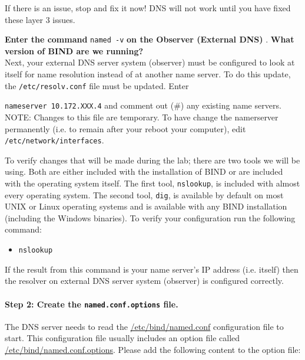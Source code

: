 \documentclass{article}
\begin{document}
If there is an issue, stop and fix it now! DNS will not work until you have fixed these layer 3 issues.  

\textbf{ \question Enter the command} {\tt named -v} \textbf{on the Observer (External DNS)} . \textbf{What version of BIND are we running?}\\

Next, your external DNS server \ubuntu system (observer) must be
configured to look at itself for name resolution instead of at another name server. To do this update, the {\tt /etc/resolv.conf} file must be updated. Enter 

{\tt nameserver 10.172.XXX.4} and comment out (\#) any existing name servers. 
NOTE: Changes to this file are temporary.  To have change the namerserver permanently (i.e. to remain after your reboot your computer), edit {\tt /etc/network/interfaces}.

To verify changes that will be made during the lab; there are two tools we will be using. Both are either included with the installation of BIND or are included with the operating system itself. The first tool, {\tt nslookup}, is included with almost every operating system. The second tool, {\tt dig}, is available by default on most UNIX or Linux operating systems and is available with any BIND installation (including the Windows binaries). To verify your configuration run the following command:
\begin{itemize}
\item {\tt nslookup} 
\end{itemize}
If the result from this command is your name server's IP address (i.e. itself) then the resolver on external DNS server \ubuntu system (observer) is configured correctly.


\paragraph{Step 2: Create the {\tt named.conf.options} file.}
The DNS server needs to read the \url{/etc/bind/named.conf} configuration file
to start. This configuration file usually includes an option 
file called \url{/etc/bind/named.conf.options}.  Please 
add the following content to the option file: 
\end{document}
